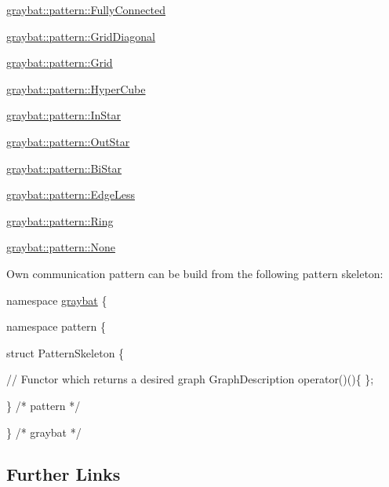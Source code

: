 \begin{DoxyItemize}
\item \hyperlink{structgraybat_1_1pattern_1_1FullyConnected}{graybat\+::pattern\+::\+Fully\+Connected}
\item \hyperlink{structgraybat_1_1pattern_1_1GridDiagonal}{graybat\+::pattern\+::\+Grid\+Diagonal}
\item \hyperlink{structgraybat_1_1pattern_1_1Grid}{graybat\+::pattern\+::\+Grid}
\item \hyperlink{structgraybat_1_1pattern_1_1HyperCube}{graybat\+::pattern\+::\+Hyper\+Cube}
\item \hyperlink{structgraybat_1_1pattern_1_1InStar}{graybat\+::pattern\+::\+In\+Star}
\item \hyperlink{structgraybat_1_1pattern_1_1OutStar}{graybat\+::pattern\+::\+Out\+Star}
\item \hyperlink{structgraybat_1_1pattern_1_1BiStar}{graybat\+::pattern\+::\+Bi\+Star}
\item \hyperlink{structgraybat_1_1pattern_1_1EdgeLess}{graybat\+::pattern\+::\+Edge\+Less}
\item \hyperlink{structgraybat_1_1pattern_1_1Ring}{graybat\+::pattern\+::\+Ring}
\item \hyperlink{structgraybat_1_1pattern_1_1None}{graybat\+::pattern\+::\+None}
\end{DoxyItemize}

Own communication pattern can be build from the following pattern skeleton\+: 
\begin{DoxyCode}
\textcolor{keyword}{namespace }\hyperlink{namespacegraybat}{graybat} \{

  \textcolor{keyword}{namespace }pattern \{

    \textcolor{keyword}{struct }PatternSkeleton \{

        \textcolor{comment}{// Functor which returns a desired graph}
        GraphDescription operator()()\{
    \};

  \} \textcolor{comment}{/* pattern */}

\} \textcolor{comment}{/* graybat */}
\end{DoxyCode}


\subsection*{Further Links}


